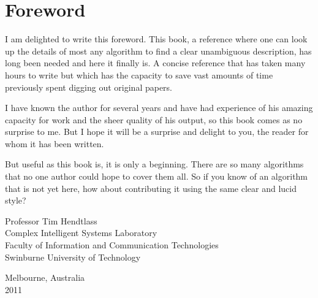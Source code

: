 % 
% 
\chapter*{Foreword}

I am delighted to write this foreword. This book, a reference where one can look up the details of most any algorithm to find a clear unambiguous description, has long been needed and here it finally is.  A concise reference that has taken many hours to write but which has the capacity to save vast amounts of time previously spent digging out original papers.

I have known the author for several years and have had experience of his amazing capacity for work and the sheer quality of his output, so this book comes as no surprise to me.  But I hope it will be a surprise and delight to you, the reader for whom it has been written.

But useful as this book is, it is only a beginning. There are so many algorithms that no one author could hope to cover them all. So if you know of an algorithm that is not yet here, how about contributing it using the same clear and lucid style?

\begin{flushright}
\vspace{0.5in}
Professor Tim Hendtlass \\
Complex Intelligent Systems Laboratory  \\
Faculty of Information and Communication Technologies  \\
Swinburne University of Technology
\end{flushright}

\begin{flushleft}
\vspace{0.2in}
Melbourne, Australia \\
2011
\end{flushleft}

